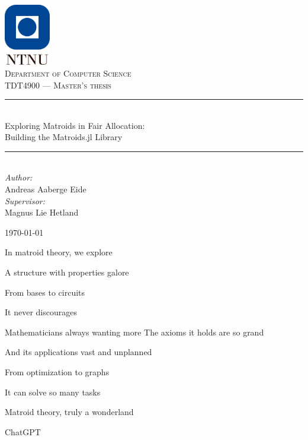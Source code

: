 \documentclass[b5paper]{report}
\begin{document}
\newcommand{\mono}[1]{$\texttt{#1}$}

\begin{titlepage}
  \newcommand{\HRule}{\rule{\linewidth}{0.5mm}}

  \vbox{ }
  \vbox{ }
  \begin{center}
    \includegraphics[width=0.15\textwidth]{ntnu.png}\\[1cm]
    \textsc{\Large Department of Computer Science}\\[1.5cm]
    \textsc{\large TDT4900 --- Master's thesis}\\[0.5cm]
    \vbox{ }

    \HRule \\[0.4cm]
    { \huge Exploring Matroids in Fair Allocation:}\\[0.1cm]
    { \huge Building the Matroids.jl Library}\\[0.1cm]
    \HRule \\[1.5cm]

    \large
    \emph{Author:}\\
    Andreas Aaberge Eide\\[0.5cm]
    \emph{Supervisor:}\\
    Magnus Lie Hetland
    \vfill

    {\large \today\par}
  \end{center}
\end{titlepage}


\epigraph{In matroid theory, we explore

A structure with properties galore

From bases to circuits

It never discourages

Mathematicians always wanting more
\newline
\newline
The axioms it holds are so grand

And its applications vast and unplanned

From optimization to graphs

It can solve so many tasks

Matroid theory, truly a wonderland}{ChatGPT}
\thispagestyle{empty}
\end{document}
